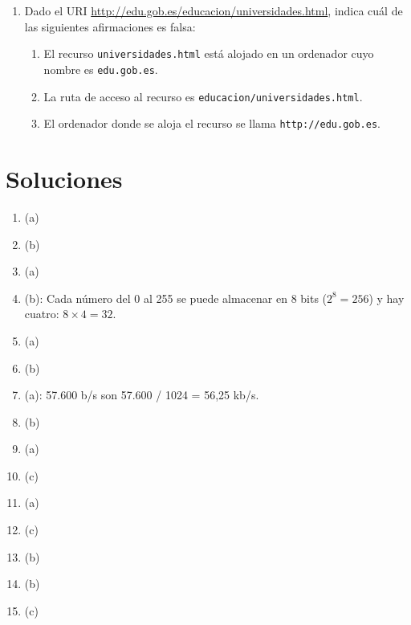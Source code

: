 \begin{enumerate}
\item Dado el URI \url{http://edu.gob.es/educacion/universidades.html}, indica cuál de las siguientes afirmaciones es falsa: \begin{enumerate} \item El recurso \texttt{universidades.html} está alojado en un ordenador cuyo nombre es \texttt{edu.gob.es}. \item La ruta de acceso al recurso es \texttt{educacion/universidades.html}. \item El ordenador donde se aloja el recurso se llama \texttt{http://edu.gob.es}. \end{enumerate} \end{enumerate} 

\section{Soluciones} \begin{enumerate} \item (a) \item (b) \item (a) \item (b): Cada número del 0 al 255 se puede almacenar en 8 bits ($2^8=256$) y hay cuatro: $8\times 4=32$. \item (a) 

\item (b) \item (a): 57.600 b/s son 57.600 / 1024 = 56,25 kb/s. \item (b) \item (a) \item (c) 

\item (a) \item (c) \item (b) \item (b) \item (c) 

\end{enumerate} 